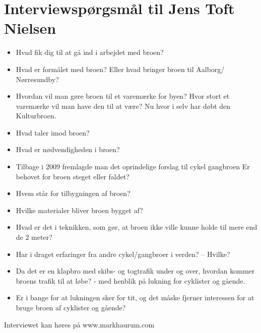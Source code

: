 \chapter{Interviewspørgsmål til Jens Toft Nielsen}
\begin{itemize}
	\item{Hvad fik dig til at gå ind i arbejdet med broen?}
	\item{Hvad er formålet med broen?
		Eller hvad bringer broen til Aalborg/ Nørresundby?}
	\item{Hvordan vil man gøre broen til et varemærke for byen? Hvor stort et varemærke vil man have den til at være? Nu hvor i selv har døbt den Kulturbroen.}
	\item{Hvad taler imod broen?}
	\item{Hvad er nødvendigheden i broen?}
	\item{Tilbage i 2009 fremlagde man det oprindelige forslag til cykel gangbroen
		Er behovet for broen steget eller faldet?}
	\item{Hvem står for tilbygningen af broen?}
	\item{Hvilke materialer bliver broen bygget af?}
	\item{Hvad er det i teknikken, som gør, at broen ikke ville kunne holde til mere end de 2 meter?}
	\item{Har i draget erfaringer fra andre cykel/gangbroer i verden? – Hvilke?}
	\item{Da det er en klapbro med skibs- og togtrafik under og over, hvordan kommer broens trafik til at løbe? - med henblik på lukning for cyklister og gående.}
	\item{Er i bange for at lukningen sker for tit, og det måske fjerner interessen for at bruge broen af cyklister og gående?}
\end{itemize}
Interviewet kan høres på www.markhaurum.com